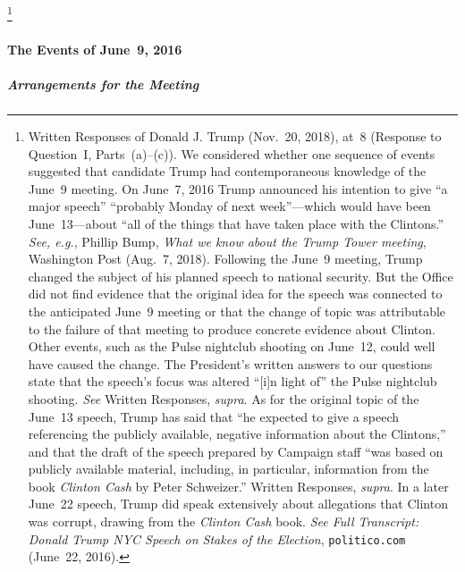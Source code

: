 \footnote{Written Responses of Donald J. Trump (Nov.~20, 2018), at~8 (Response to Question~I, Parts~(a)--(c)).
We considered whether one sequence of events suggested that candidate Trump had contemporaneous knowledge of the June~9 meeting.
On June~7, 2016 Trump announced his intention to give ``a major speech'' ``probably Monday of next week''---which would have been June~13---about ``all of the things that have taken place with the Clintons.''
\textit{See, e.g.}, Phillip Bump, \textit{What we know about the Trump Tower meeting}, Washington Post (Aug.~7, 2018).
Following the June~9 meeting, Trump changed the subject of his planned speech to national security.
But the Office did not find evidence that the original idea for the speech was connected to the anticipated June~9 meeting or that the change of topic was attributable to the failure of that meeting to produce concrete evidence about Clinton.
Other events, such as the Pulse nightclub shooting on June~12, could well have caused the change.
The President's written answers to our questions state that the speech's focus was altered ``[i]n light of\thinspace'' the Pulse nightclub shooting.
\textit{See} Written Responses, \textit{supra}.
As for the original topic of the June~13 speech, Trump has said that ``he expected to give a speech referencing the publicly available, negative information about the Clintons,'' and that the draft of the speech prepared by Campaign staff ``was based on publicly available material, including, in particular, information from the book \textit{Clinton Cash} by Peter Schweizer.''
Written Responses, \textit{supra}.
In a later June~22 speech, Trump did speak extensively about allegations that Clinton was corrupt, drawing from the \textit{Clinton Cash} book.
\textit{See Full Transcript: Donald Trump NYC Speech on Stakes of the Election}, \verb+politico.com+ (June~22, 2016).}

\paragraph{The Events of June~9, 2016}

\subparagraph{Arrangements for the Meeting}


